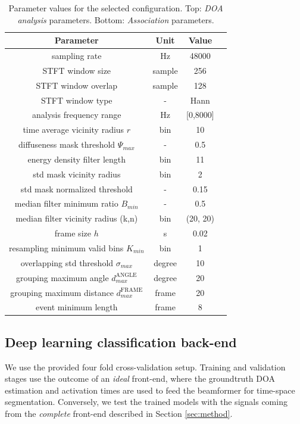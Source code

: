 \begin{table}[!htbp]

\centering
\caption{Parameter values for the selected configuration. Top: \textit{DOA analysis} parameters. Bottom: \textit{Association} parameters.}
\begin{tabular}{cccc}
\toprule
Parameter & Unit & Value\\
\midrule
sampling rate & Hz  & 48000\\
STFT window size & sample  & 256\\
STFT window overlap & sample & 128\\
STFT window type & -  &  Hann\\
analysis frequency range & Hz & [0,8000]\\
time average vicinity radius $r$ & bin& 10 \\
diffuseness mask threshold $\Psi_{max}$ & - & 0.5 \\
energy density filter length & bin & 11\\
std mask vicinity radius & bin &  2\\
std mask normalized threshold & - & 0.15\\
median filter minimum ratio $B_{min}$ & - & 0.5 \\
median filter vicinity radius (k,n) & bin & (20, 20) \\
\midrule
frame size $h$ & s  & 0.02\\
resampling minimum valid bins $K_{min}$ & bin & 1 \\
overlapping std threshold $\sigma_{max}$ & degree & 10 \\
grouping maximum angle $d_{max}^\text{ANGLE}$ & degree & 20\\
grouping maximum distance $d_{max}^\text{FRAME}$ & frame & 20\\
event minimum length & frame & 8\\
\bottomrule
\end{tabular}
\label{tab:params_front}
\end{table}


\subsection{Deep learning classification back-end}
\label{ssec:backend_experiments}

We use the provided four fold cross-validation setup.
Training and validation stages use the outcome of an \textit{ideal} front-end, where the groundtruth DOA estimation and activation times are used to feed the beamformer for time-space segmentation.
Conversely, we test the trained models with the signals coming from the \textit{complete} front-end described in Section \ref{sec:method}.

